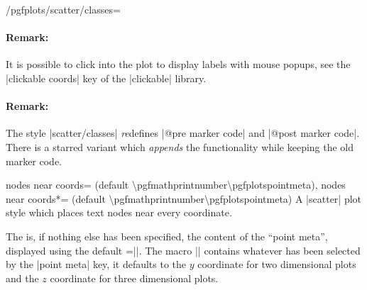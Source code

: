 {\begin{stylekey}{/pgfplots/scatter/classes=}


    \paragraph{Remark:}

    It is possible to click into the plot to display labels with mouse popups,
    see the |clickable coords| key of the |clickable| library.

    \paragraph{Remark:}

    The style |scatter/classes| \emph{re}defines |@pre marker code| and
    |@post marker code|. There is a starred variant
     which \emph{appends} the functionality
    while keeping the old marker code.
\end{stylekey}

\begin{pgfplotskeylist}{%
    nodes near coords= (default \textbackslash pgfmathprintnumber\textbackslash pgfplotspointmeta),
    nodes near coords*= (default \textbackslash pgfmathprintnumber\textbackslash pgfplotspointmeta)%
}
\label{pgfplots:example:pointmeta:nodesnearcoords}
    A |scatter| plot style which places text nodes near every coordinate.

\begin{codeexample}[]
\end{codeexample}
    The  is, if nothing else has been specified, the content of
    the ``point meta'', displayed using the default
    =|\pgfmathprintnumber{\pgfplotspointmeta}|. The macro
    |\pgfplotspointmeta| contains whatever has been selected by the
    |point meta| key, it defaults to the $y$ coordinate for two dimensional
    plots and the $z$ coordinate for three dimensional plots.


\end{pgfplotskeylist}}
